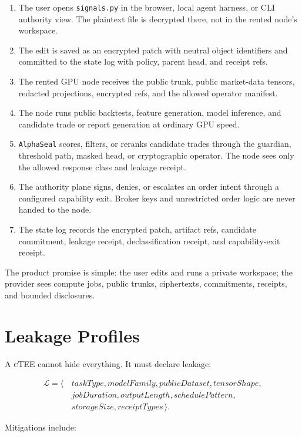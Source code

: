 \documentclass[11pt]{article}
\newcommand{\ctee}{\textnormal{\textsc{cTEE}}}
\newcommand{\leak}{\mathcal{L}}
\newcommand{\code}[1]{\texttt{#1}}
\begin{document}
\begin{enumerate}[leftmargin=1.5em]
\item The user opens \code{signals.py} in the browser, local agent harness, or
CLI authority view. The plaintext file is decrypted there, not in the rented
node's workspace.
\item The edit is saved as an encrypted patch with neutral object identifiers
and committed to the state log with policy, parent head, and receipt refs.
\item The rented GPU node receives the public trunk, public market-data
tensors, redacted projections, encrypted refs, and the allowed operator
manifest.
\item The node runs public backtests, feature generation, model inference, and
candidate trade or report generation at ordinary GPU speed.
\item \code{AlphaSeal} scores, filters, or reranks candidate trades through the
guardian, threshold path, masked head, or cryptographic operator. The node sees
only the allowed response class and leakage receipt.
\item The authority plane signs, denies, or escalates an order intent through
a configured capability exit. Broker keys and unrestricted order logic are
never handed to the node.
\item The state log records the encrypted patch, artifact refs, candidate
commitment, leakage receipt, declassification receipt, and capability-exit
receipt.
\end{enumerate}

The product promise is simple: the user edits and runs a private workspace; the
provider sees compute jobs, public trunks, ciphertexts, commitments, receipts,
and bounded disclosures.

\section{Leakage Profiles}

A \ctee{} cannot hide everything. It must declare leakage:

\[
\begin{aligned}
\leak = \langle\,& taskType, modelFamily, publicDataset, tensorShape,\\
& jobDuration, outputLength, schedulePattern,\\
& storageSize, receiptTypes \,\rangle .
\end{aligned}
\]

Mitigations include:
\end{document}
